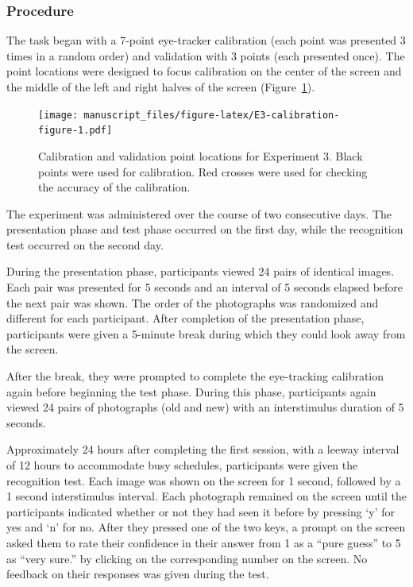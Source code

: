 \documentclass[
  man,floatsintext]{apa6}
\begin{document}
\subsubsection{Procedure}\label{procedure-3}

The task began with a 7-point eye-tracker calibration (each point was
presented 3 times in a random order) and validation with 3 points (each
presented once). The point locations were designed to focus calibration
on the center of the screen and the middle of the left and right halves
of the screen (Figure~\ref{fig:E3-calibration-figure}).

\begin{figure}
\centering
\texttt{[image: manuscript\_files/figure-latex/E3-calibration-figure-1.pdf]}
\caption{\label{fig:E3-calibration-figure}Calibration and validation point locations for Experiment 3. Black points were used for calibration. Red crosses were used for checking the accuracy of the calibration.}
\end{figure}

The experiment was administered over the course of two
consecutive days. The presentation phase and test phase occurred on
the first day, while the recognition test occurred on the second day.

During the presentation phase, participants viewed 24 pairs of identical
images. Each pair was presented for
5 seconds and an interval of 5 seconds elapsed before the next pair was
shown. The order of the photographs was randomized and different for
each participant. After completion of the presentation phase,
participants were given a 5-minute break during which they could look
away from the screen.

After the break, they were prompted to complete the eye-tracking
calibration again before beginning the test phase. During this phase,
participants again viewed 24 pairs of photographs (old and new) with an interstimulus
duration of 5 seconds.

Approximately 24 hours after completing the first session, with a leeway
interval of 12 hours to accommodate busy schedules, participants were
given the recognition test. Each image was shown on the screen for 1 second, followed by a
1 second interstimulus interval. Each photograph remained on the screen until the participants indicated whether or not they had seen it before by pressing `y' for yes and `n' for no. After they pressed one of the two keys, a prompt on the screen
asked them to rate their confidence in their answer from 1 as a ``pure
guess'' to 5 as ``very sure.'' by clicking on the corresponding number on
the screen. No feedback on their responses was given during the test.
\end{document}
